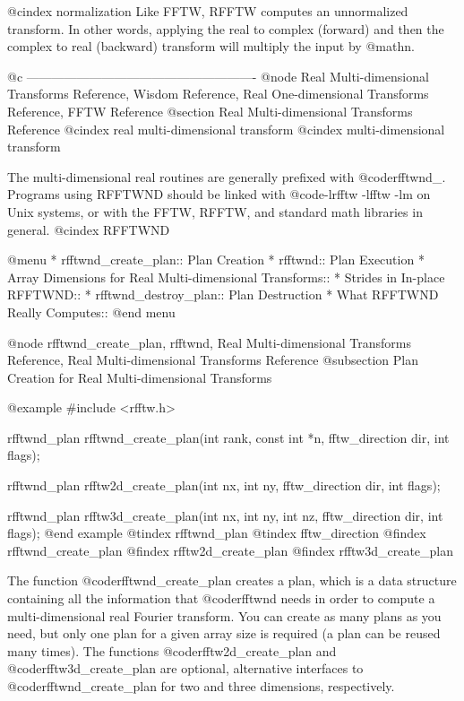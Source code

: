 @cindex normalization
Like FFTW, RFFTW computes an unnormalized transform.  In other words,
applying the real to complex (forward) and then the complex to real
(backward) transform will multiply the input by @math{n}.

@c -------------------------------------------------------
@node Real Multi-dimensional Transforms Reference, Wisdom Reference, Real One-dimensional Transforms Reference, FFTW Reference
@section Real Multi-dimensional Transforms Reference
@cindex real multi-dimensional transform
@cindex multi-dimensional transform

The multi-dimensional real routines are generally prefixed with
@code{rfftwnd_}.  Programs using RFFTWND should be linked with
@code{-lrfftw -lfftw -lm} on Unix systems, or with the FFTW, RFFTW, and
standard math libraries in general.
@cindex RFFTWND

@menu
* rfftwnd_create_plan::         Plan Creation
* rfftwnd::                     Plan Execution
* Array Dimensions for Real Multi-dimensional Transforms::  
* Strides in In-place RFFTWND::  
* rfftwnd_destroy_plan::        Plan Destruction
* What RFFTWND Really Computes::  
@end menu

@node   rfftwnd_create_plan, rfftwnd, Real Multi-dimensional Transforms Reference, Real Multi-dimensional Transforms Reference
@subsection Plan Creation for Real Multi-dimensional Transforms

@example
#include <rfftw.h>

rfftwnd_plan rfftwnd_create_plan(int rank, const int *n,
                                 fftw_direction dir, int flags);

rfftwnd_plan rfftw2d_create_plan(int nx, int ny,
                                 fftw_direction dir, int flags);

rfftwnd_plan rfftw3d_create_plan(int nx, int ny, int nz,
                                 fftw_direction dir, int flags);
@end example
@tindex rfftwnd_plan
@tindex fftw_direction
@findex rfftwnd_create_plan
@findex rfftw2d_create_plan
@findex rfftw3d_create_plan

The function @code{rfftwnd_create_plan} creates a plan, which is a data
structure containing all the information that @code{rfftwnd} needs in
order to compute a multi-dimensional real Fourier transform.  You can
create as many plans as you need, but only one plan for a given array
size is required (a plan can be reused many times).  The functions
@code{rfftw2d_create_plan} and @code{rfftw3d_create_plan} are optional,
alternative interfaces to @code{rfftwnd_create_plan} for two and three
dimensions, respectively.

